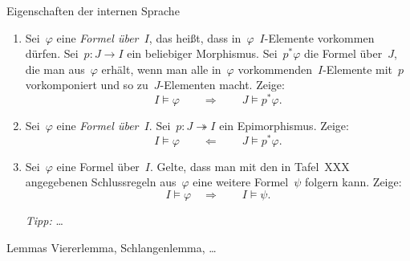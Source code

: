 \documentclass{uebblatt}
\begin{document}
\begin{aufgabe}{Eigenschaften der internen Sprache}
\begin{enumerate}
\item Sei~$\varphi$ eine \emph{Formel über~$I$}, das heißt, dass
in~$\varphi$~$I$-Elemente vorkommen dürfen. Sei~$p : J \to I$ ein beliebiger
Morphismus. Sei~$p^*\varphi$ die Formel über~$J$, die man aus~$\varphi$ erhält,
wenn man alle in~$\varphi$ vorkommenden~$I$-Elemente mit~$p$ vorkomponiert und
so zu~$J$-Elementen macht. Zeige:
\[ I \models \varphi \qquad\Longrightarrow\qquad
  J \models p^*\varphi. \]
\item Sei~$\varphi$ eine \emph{Formel über~$I$}. Sei~$p : J \twoheadrightarrow
I$ ein Epimorphismus. Zeige:
\[ I \models \varphi \qquad\Longleftarrow\qquad
  J \models p^*\varphi. \]
\item Sei~$\varphi$ eine Formel über~$I$. Gelte, dass man mit den in Tafel~XXX
angegebenen Schlussregeln aus~$\varphi$ eine weitere Formel~$\psi$ folgern
kann. Zeige:
\[ I \models \varphi \quad\Longrightarrow\qquad I \models \psi. \]

\emph{Tipp:} \ldots
\end{enumerate}
\end{aufgabe}

\begin{aufgabe}{Lemmas}
Viererlemma, Schlangenlemma, \ldots
\end{aufgabe}
\end{document}

